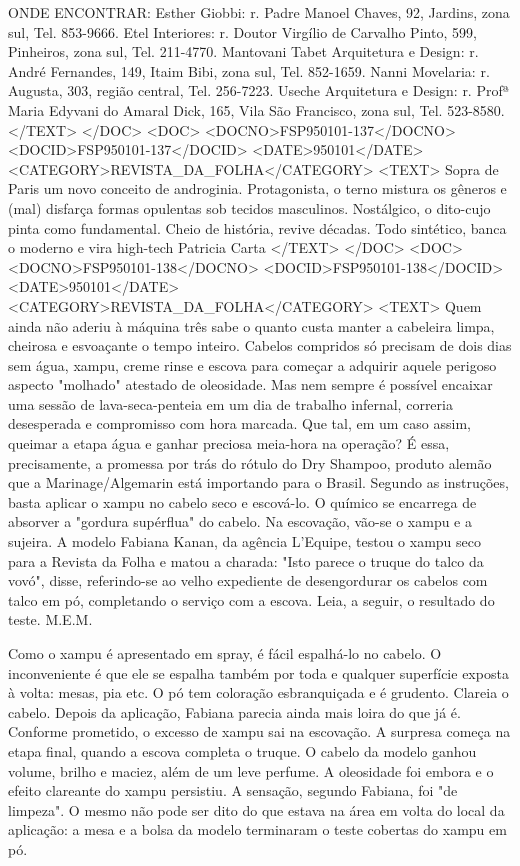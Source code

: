 ONDE ENCONTRAR: Esther Giobbi: r. Padre Manoel Chaves, 92, Jardins, zona sul, Tel. 853-9666. Etel Interiores: r. Doutor Virgílio de Carvalho Pinto, 599, Pinheiros, zona sul, Tel. 211-4770. Mantovani Tabet Arquitetura e Design: r. André Fernandes, 149, Itaim Bibi, zona sul, Tel. 852-1659. Nanni Movelaria: r. Augusta, 303, região central, Tel. 256-7223. Useche Arquitetura e Design: r. Profª Maria Edyvani do Amaral Dick, 165, Vila São Francisco, zona sul, Tel. 523-8580.
</TEXT>
</DOC>
<DOC>
<DOCNO>FSP950101-137</DOCNO>
<DOCID>FSP950101-137</DOCID>
<DATE>950101</DATE>
<CATEGORY>REVISTA_DA_FOLHA</CATEGORY>
<TEXT>
Sopra de Paris um novo conceito de androginia. Protagonista, o terno mistura os gêneros e (mal) disfarça formas opulentas sob tecidos masculinos. Nostálgico, o dito-cujo pinta como fundamental. Cheio de história, revive décadas. Todo sintético, banca o moderno e vira high-tech
Patricia Carta
</TEXT>
</DOC>
<DOC>
<DOCNO>FSP950101-138</DOCNO>
<DOCID>FSP950101-138</DOCID>
<DATE>950101</DATE>
<CATEGORY>REVISTA_DA_FOLHA</CATEGORY>
<TEXT>
Quem ainda não aderiu à máquina três sabe o quanto custa manter a cabeleira limpa, cheirosa e esvoaçante o tempo inteiro. Cabelos compridos só precisam de dois dias sem água, xampu, creme rinse e escova para começar a adquirir aquele perigoso aspecto "molhado" atestado de oleosidade. Mas nem sempre é possível encaixar uma sessão de lava-seca-penteia em um dia de trabalho infernal, correria desesperada e compromisso com hora marcada. Que tal, em um caso assim, queimar a etapa água e ganhar preciosa meia-hora na operação?
É essa, precisamente, a promessa por trás do rótulo do Dry Shampoo, produto alemão que a Marinage/Algemarin está importando para o Brasil. Segundo as instruções, basta aplicar o xampu no cabelo seco e escová-lo. O químico se encarrega de absorver a "gordura supérflua" do cabelo. Na escovação, vão-se o xampu e a sujeira.
A modelo Fabiana Kanan, da agência L'Equipe, testou o xampu seco para a Revista da Folha e matou a charada: "Isto parece o truque do talco da vovó", disse, referindo-se ao velho expediente de desengordurar os cabelos com talco em pó, completando o serviço com a escova. Leia, a seguir, o resultado do teste.
M.E.M.

Como o xampu é apresentado em spray, é fácil espalhá-lo no cabelo. O inconveniente é que ele se espalha também por toda e qualquer superfície exposta à volta: mesas, pia etc. O pó tem coloração esbranquiçada e é grudento. Clareia o cabelo. Depois da aplicação, Fabiana parecia ainda mais loira do que já é. Conforme prometido, o excesso de xampu sai na escovação. A surpresa começa na etapa final, quando a escova completa o truque. O cabelo da modelo ganhou volume, brilho e maciez, além de um leve perfume. A oleosidade foi embora e o efeito clareante do xampu persistiu. A sensação, segundo Fabiana, foi "de limpeza". O mesmo não pode ser dito do que estava na área em volta do local da aplicação: a mesa e a bolsa da modelo terminaram o teste cobertas do xampu em pó.


